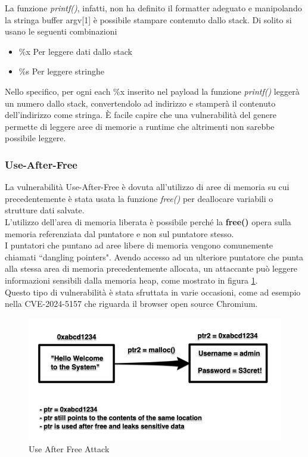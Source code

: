 La funzione \textit{printf()}, infatti, non ha definito il formatter adeguato e manipolando la stringa buffer argv[1] è possibile stampare contenuto dallo stack. Di solito si usano le seguenti combinazioni

\begin{itemize}
    \item \%x Per leggere dati dallo stack
    \item \%s Per leggere stringhe
\end{itemize}

Nello specifico, per ogni each \%x inserito nel payload la funzione \textit{printf()} leggerà un numero dallo stack, convertendolo ad indirizzo e stamperà il contenuto dell'indirizzo come stringa. È facile capire che una vulnerabilità del genere permette di leggere aree di memorie a runtime che altrimenti non sarebbe possibile leggere. 


\subsubsection*{Use-After-Free}

La vulnerabilità Use-After-Free \cite{Kaspersky} è dovuta all'utilizzo di aree di memoria su cui precedentemente è stata usata la funzione \textit{free()} per deallocare variabili o strutture dati salvate.\\
L'utilizzo dell'area di memoria liberata è possibile perché la \textbf{free()} opera sulla memoria referenziata dal puntatore e non sul puntatore stesso.\\
I puntatori che puntano ad aree libere di memoria vengono comunemente chiamati ``dangling pointers". Avendo accesso ad un ulteriore puntatore che punta alla stessa area di memoria precedentemente allocata, un attaccante può leggere informazioni sensibili dalla memoria heap, come mostrato in figura \ref{fig:useafterfree}.\\
Questo tipo di vulnerabilità è stata sfruttata in varie occasioni, come ad esempio nella CVE-2024-5157 \cite{ChromiumCVE} che riguarda il browser open source Chromium.

\vspace{1cm}
\FloatBarrier
\begin{figure}[!htbp]
    \centering
    \includegraphics[width=0.7\linewidth]{images/use-after-free.png}
    \caption{Use After Free Attack}
    \label{fig:useafterfree}
\end{figure}
\FloatBarrier
\vspace{1cm}

